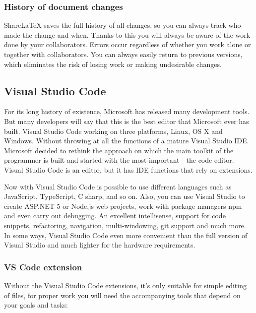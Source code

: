 \subsubsection{History of document changes}
ShareLaTeX saves the full history of all changes, so you can always track who made the change and when. Thanks to this you will always be aware of the work done by your collaborators.
Errors occur regardless of whether you work alone or together with collaborators. You can always easily return to previous versions, which eliminates the risk of losing work or making undesirable changes. \cite{Sharelatex}\par

\subsection{Visual Studio Code}
For its long history of existence, Microsoft has released many development tools. But many developers will say that this is the best editor that Microsoft ever has built. Visual Studio Code working on three platforms, Linux, OS X and Windows. Without throwing at all the functions of a mature Visual Studio IDE. Microsoft decided to rethink the approach on which the main toolkit of the programmer is built and started with the most important - the code editor. Visual Studio Code is an editor, but it has IDE functions that rely on extensions.\par
Now with Visual Studio Code is possible to use different languages such as JavaScript, TypeScript, C sharp, and so on. Also, you can use Visual Studio to create ASP.NET 5 or Node.js web projects, work with package managers npm and even carry out debugging. An excellent intellisense, support for code snippets, refactoring, navigation, multi-windowing, git support and much more. In some ways, Visual Studio Code even more convenient than the full version of Visual Studio and much lighter for the hardware requirements. \cite{VSintro} 

\subsubsection{VS Code extension}
Without the Visual Studio Code extensions, it's only suitable for simple editing of files, for proper work you will need the accompanying tools that depend on your goals and tasks:

